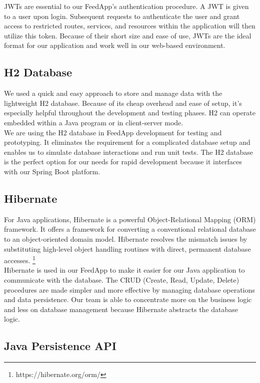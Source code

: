 \noindent JWTs are essential to our FeedApp's authentication procedure. A JWT is given to a user upon login. Subsequent requests to authenticate the user and grant access to restricted routes, services, and resources within the application will then utilize this token. Because of their short size and ease of use, JWTs are the ideal format for our application and work well in our web-based environment.

\subsection{H2 Database}

\noindent We used a quick and easy approach to store and manage data with the lightweight H2 database. Because of its cheap overhead and ease of setup, it's especially helpful throughout the development and testing phases. H2 can operate embedded within a Java program or in client-server mode. \\

\noindent We are using the H2 database in FeedApp development for testing and prototyping. It eliminates the requirement for a complicated database setup and enables us to simulate database interactions and run unit tests. The H2 database is the perfect option for our needs for rapid development because it interfaces with our Spring Boot platform.


\subsection{Hibernate}

\noindent  For Java applications, Hibernate is a powerful Object-Relational Mapping (ORM) framework. It offers a framework for converting a conventional relational database to an object-oriented domain model. Hibernate resolves the mismatch issues by substituting high-level object handling routines with direct, permanent database accesses. \footnote{https://hibernate.org/orm/} \\

\noindent Hibernate is used in our FeedApp to make it easier for our Java application to communicate with the database. The CRUD (Create, Read, Update, Delete) procedures are made simpler and more effective by managing database operations and data persistence. Our team is able to concentrate more on the business logic and less on database management because Hibernate abstracts the database logic.

\subsection{Java Persistence API}

